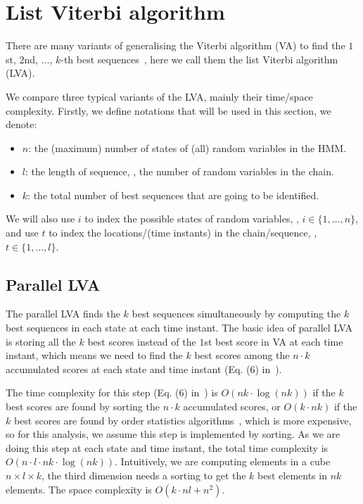 \section{List Viterbi algorithm}
\label{sec:lva}

There are many variants of generalising the Viterbi algorithm (VA) to find the 
$1$st, $2$nd, $\dots$, $k$-th best sequences~\cite{seshadri1994list,nilsson2001sequentially},
here we call them the list Viterbi algorithm (LVA).

We compare three typical variants of the LVA, mainly their time/space complexity.
Firstly, we define notations that will be used in this section, we denote:
\begin{itemize}
\item $n$: the (maximum) number of states of (all) random variables in the HMM.
\item $l$: the length of sequence, \ie, the number of random variables in the chain.
\item $k$: the total number of best sequences that are going to be identified.
\end{itemize}
We will also use $i$ to index the possible states of random variables, \ie, $i \in \{1, \dots, n\}$,
and use $t$ to index the locations/(time instants) in the chain/sequence, \ie, $t \in \{1, \dots, l\}$.

\subsection{Parallel LVA}
\label{sec:plva}

The parallel LVA finds the $k$ best sequences simultaneously by computing the $k$ best sequences in each state at each time instant.
The basic idea of parallel LVA is storing all the $k$ best scores instead of the $1$st best score in VA at each time instant,
which means we need to find the $k$ best scores among the $n\cdot k$ accumulated scores at each state and time instant 
(Eq. (6) in~\cite{seshadri1994list}).

The time complexity for this step (Eq. (6) in~\cite{seshadri1994list})
is $O \left( nk\cdot \log(nk) \right)$ if the $k$ best scores are found by sorting the $n\cdot k$ accumulated scores,
or $O \left( k \cdot nk \right)$ if the $k$ best scores are found by order statistics algorithms~\cite{clrs2009}, which is more expensive,
so for this analysis, we assume this step is implemented by sorting.
As we are doing this step at each state and time instant, the total time complexity is $O \left( n \cdot l \cdot nk \cdot \log(nk) \right)$.
Intuitively, we are computing elements in a cube $n \times l \times k$, 
the third dimension needs a sorting to get the $k$ best elements in $nk$ elements.
The space complexity is $O \left( k \cdot nl + n^2 \right)$.


